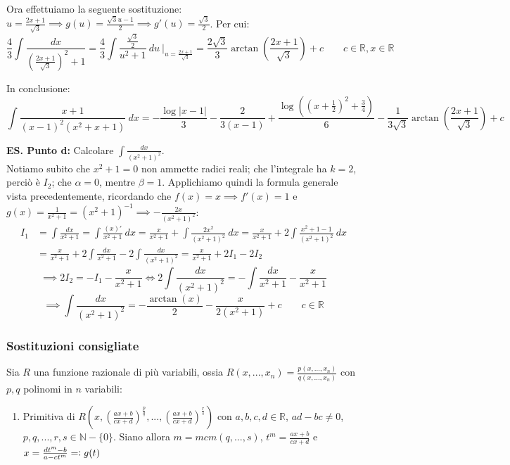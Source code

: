 \documentclass{article}
\begin{document}
\noindent Ora effettuiamo la seguente sostituzione: $u = \frac{2x + 1}{\sqrt{3}} \implies g(u) = \frac{\sqrt{3} u - 1}{2} \implies g'(u) = \frac{\sqrt{3}}{2}$. Per cui:
\begin{equation*}
    \frac{4}{3} \int \frac{dx}{(\frac{2x + 1}{\sqrt{3}})^2 + 1} = \frac{4}{3} \int \frac{\frac{\sqrt{3}}{2}}{u^2 + 1} \ du \ \bigg|_{u = \frac{2x + 1}{\sqrt{3}}} = \frac{2\sqrt{3}}{3}\arctan\left(\frac{2x + 1}{\sqrt{3}}\right) + c \qquad c \in \mathbb{R}, x \in \mathbb{R}
\end{equation*}

\noindent In conclusione:
\begin{equation*}
    \int \frac{x + 1}{(x - 1)^2(x^2 + x + 1)} \ dx = -\frac{\log|x - 1|}{3} - \frac{2}{3(x - 1)} + \frac{\log((x + \frac{1}{2})^2 + \frac{3}{4})}{6} - \frac{1}{3\sqrt{3}}\arctan\left(\frac{2x + 1}{\sqrt{3}}\right) + c
\end{equation*}

\noindent\textbf{ES. Punto d:} Calcolare $\int \frac{dx}{(x^2 + 1)^2}$.\\
Notiamo subito che $x^2 + 1 = 0$ non ammette radici reali; che l'integrale ha $k = 2$, perciò è $I_2$; che $\alpha = 0$, mentre $\beta = 1$. Applichiamo quindi la formula generale vista precedentemente, ricordando che $f(x) = x \implies f'(x) = 1$ e $g(x) = \frac{1}{x^2 + 1} = (x^2 + 1)^{-1} \implies - \frac{2x}{(x^2 + 1)^2}$:
\begin{align*}
    I_1 &= \int \frac{dx}{x^2 + 1} = \int \frac{(x)'}{x^2 + 1} \ dx= \frac{x}{x^2 + 1} + \int \frac{2x^2}{(x^2 + 1)^2} \ dx = \frac{x}{x^2 + 1} + 2\int \frac{x^2 + 1 - 1}{(x^2 + 1)^2} \ dx \\
    &= \frac{x}{x^2 + 1} + 2\int \frac{dx}{x^2 + 1} - 2\int \frac{dx}{(x^2 + 1)^2} = \frac{x}{x^2 + 1} + 2I_1 - 2I_2
\end{align*}
\begin{equation*}
    \implies 2I_2 = -I_1 - \frac{x}{x^2 + 1} \iff 2\int \frac{dx}{(x^2 + 1)^2} = -\int \frac{dx}{x^2 + 1} - \frac{x}{x^2 + 1}
\end{equation*}
\begin{equation*}
    \implies \int \frac{dx}{(x^2 + 1)^2} = -\frac{\arctan(x)}{2} - \frac{x}{2(x^2 + 1)} + c \qquad c \in \mathbb{R}
\end{equation*}

\subsubsection{Sostituzioni consigliate}
Sia $R$ una funzione razionale di più variabili, ossia $R(x, ..., x_n) = \frac{p(x, ..., x_n)}{q(x, ..., x_n)}$ con $p, q$ polinomi in $n$ variabili:
\begin{enumerate}
    \item Primitiva di $R(x, (\frac{ax + b}{cx + d})^\frac{p}{q}, ..., (\frac{ax + b}{cx + d})^\frac{r}{s})$ con $a, b, c, d \in \mathbb{R}$, $ad - bc \neq 0$, $p, q, ..., r, s \in \mathbb{N} - \{0\}$. Siano allora $m = mcm(q, ..., s)$, $t^m = \frac{ax + b}{cx + d}$ e $x = \frac{dt^m - b}{a - ct^m} =\vcentcolon g(t)$
\end{enumerate}
\end{document}

